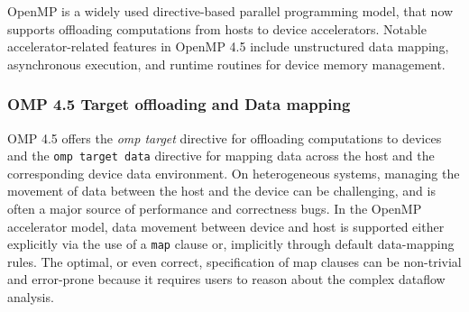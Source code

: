 OpenMP is a widely used directive-based parallel programming
model, that now supports offloading computations from hosts to device 
accelerators. 
Notable accelerator-related features 
in OpenMP 4.5 include unstructured data
mapping, asynchronous execution, and runtime routines for device
memory management. 
\subsubsection{OMP 4.5 Target offloading and Data mapping}
OMP 4.5 offers the \textit{omp target} directive 
for offloading computations to devices and the \texttt{omp target data}
directive for mapping data across the host and the corresponding
device data environment.
On heterogeneous systems, managing the movement of data between the host and the device can be challenging, and is often a major source of performance and correctness bugs. 
In the OpenMP accelerator model, 
data movement between device and host 
is supported either explicitly via the use of a \texttt{map} clause 
or, implicitly through default data-mapping rules. 
The optimal, or even correct, specification of map clauses can be non-trivial and error-prone because it requires users to reason about the complex dataflow analysis. 
